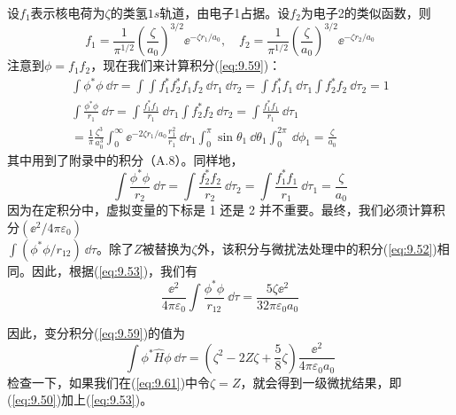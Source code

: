     设$f_1$表示核电荷为$\zeta$的类氢$1s$轨道，由电子1占据。设$f_2$为电子2的类似函数，则
    \begin{equation}
        f_1 = \frac{1}{\pi^{1/2}}\left(\frac{\zeta}{a_0}\right)^{3/2} \ee ^{-\zeta r_1/a_0}, \quad f_2 = \frac{1}{\pi^{1/2}}\left(\frac{\zeta}{a_0}\right)^{3/2} \ee ^{-\zeta r_2/a_0}
        \label{eq:9.60}
    \end{equation}
    注意到$\phi = f_1 f_2$，现在我们来计算积分(\ref{eq:9.59})：
    \begin{equation*}
        \begin{aligned}
            \int \phi^* \phi \: \dd \tau = \int \int f_1^* f_2^* f_1 f_2 \: \dd \tau_1 \: \dd \tau_2 = \int f_1^* f_1 \: \dd \tau_1 \int f_2^* f_2 \: \dd \tau_2 = 1 \\
            \int \frac{\phi^* \phi}{r_1} \: \dd \tau = \int \frac{f_1^*f_1}{r_1} \: \dd \tau_1 \int f_2^* f_2 \: \dd \tau_2 = \int \frac{f_1^* f_1}{r_1} \: \dd \tau_1 \\
            = \frac{1}{\pi}\frac{\zeta^3}{a_0^3}\int_{0}^{\infty} \ee ^{-2\zeta r_1/a_0} \frac{r_1^2}{r_1} \:\dd r_1 \int_{0}^{\pi} \sin\theta_1 \:\dd \theta_1 \int_{0}^{2\pi} \:\dd \phi_1 = \frac{\zeta}{a_0}
        \end{aligned}
    \end{equation*}
    其中用到了附录中的积分（A.8）。同样地，
    \begin{equation*}
        \int \frac{\phi^* \phi}{r_2} \: \dd \tau = \int \frac{f_2^*f_2}{r_2}\: \dd \tau_2 = \int \frac{f_1^*f_1}{r_1} \: \dd \tau_1 = \frac{\zeta}{a_0}
    \end{equation*}
    因为在定积分中，虚拟变量的下标是 1 还是 2 并不重要。最终，我们必须计算积分$\left(\ee ^2 / 4\pi\varepsilon_0\right)$\\$ \int \left(\phi^* \phi / r_{12}\right) \: \dd \tau$。除了$Z$被替换为$\zeta$外，该积分与微扰法处理中的积分(\ref{eq:9.52})相同。因此，根据(\ref{eq:9.53})，我们有
    \begin{equation*}
        \frac{\ee ^2}{4\pi\varepsilon_0}\int \frac{\phi^* \phi}{r_{12}} \: \dd \tau = \frac{5\zeta\ee ^2}{32\pi\varepsilon_0a_0}
    \end{equation*}

    因此，变分积分(\ref{eq:9.59})的值为
    \begin{equation}
        \int \phi^* \hat{H} \phi \: \dd \tau = \left(\zeta^2 - 2Z\zeta + \frac{5}{8}\zeta\right)\frac{\ee ^2}{4\pi\varepsilon_0a_0}
        \label{eq:9.61}
    \end{equation}
    检查一下，如果我们在(\ref{eq:9.61})中令$\zeta = Z$，就会得到一级微扰结果，即(\ref{eq:9.50})加上(\ref{eq:9.53})。

